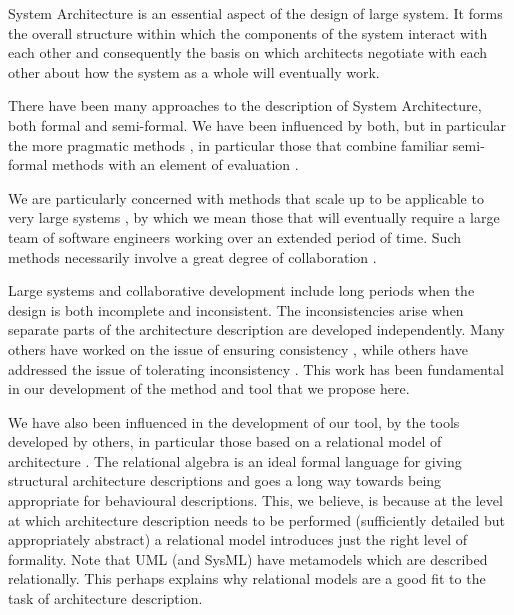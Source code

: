 \documentclass[times, 10pt,twocolumn]{article}
\begin{document}
System Architecture is an essential aspect of the design of large system. It forms the overall structure within which the components of the system interact with each other \cite{Kruchten,Maier,Rozanski,Shaw1} and consequently the basis on which architects negotiate with each other about how the system as a whole will eventually work. 

There have been many approaches to the description of System Architecture, both formal and semi-formal. We have been influenced by both, but in particular the more pragmatic methods \cite{Gokhale,Henderson2,Holt,Alloy}, in particular those that combine familiar semi-formal methods with an element of evaluation \cite{Chang,Egyed3,Shaw,Shen}. 

We are particularly concerned with methods that scale up to be applicable to very large systems \cite{Balzer,Fickas05clinicalrequirements,Henderson1,Maier,Nuseibeh01makinginconsistency}, by which we mean those that will eventually require a large team of software engineers working over an extended period of time. Such methods necessarily involve a great degree of collaboration \cite{Dekel,Nejati07matchingand,1150731}.

Large systems and collaborative development include long periods when the design is both incomplete and inconsistent. The inconsistencies arise when separate parts of the architecture description are developed independently. Many others have worked on the issue of ensuring consistency \cite{Chang2,Egyed1,Sabetzadeh_globalconsistency,Sabetzadeh07consistencychecking}, while others have addressed the issue of tolerating inconsistency \cite{Balzer,Nuseibeh01makinginconsistency}. This work has been fundamental in our development of the method and tool that we propose here.

We have also been influenced in the development of our tool, by the tools developed by others, in particular those based on a relational model of architecture  \cite{Crocopat,Crocopat2,Egyed2,Holt}. The relational algebra \cite{Date,Holt,Alloy} is an ideal formal language for giving structural architecture descriptions and goes a long way towards being appropriate for behavioural descriptions. This, we believe, is because at the level at which architecture description needs to be performed (sufficiently detailed but appropriately abstract) a relational model introduces just the right level of formality. Note that UML (and SysML) have metamodels which are described relationally. This perhaps explains why relational models are a good fit to the task of architecture description.
\end{document}
